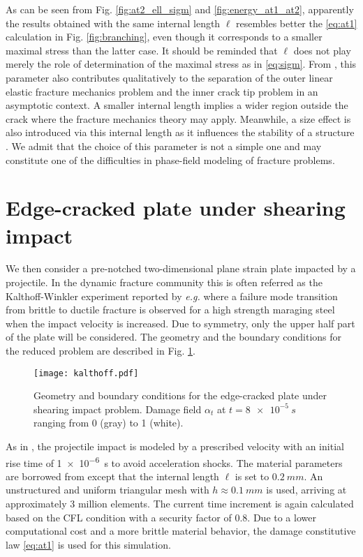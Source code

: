 As can be seen from Fig. \ref{fig:at2_ell_sigm} and \ref{fig:energy_at1_at2}, apparently the results obtained with the same internal length $\ell$ resembles better the \eqref{eq:at1} calculation in Fig. \ref{fig:branching}, even though it corresponds to a smaller maximal stress than the latter case. It should be reminded that $\ell$ does not play merely the role of determination of the maximal stress as in \eqref{eq:sigm}. From \cite{SicsicMarigo:2013}, this parameter also contributes qualitatively to the separation of the outer linear elastic fracture mechanics problem and the inner crack tip problem in an asymptotic context. A smaller internal length implies a wider region outside the crack where the fracture mechanics theory may apply. Meanwhile, a size effect is also introduced via this internal length as it influences the stability of a structure \cite{PhamMarigo:2013-1}. We admit that the choice of this parameter is not a simple one and may constitute one of the difficulties in phase-field modeling of fracture problems.

\section{Edge-cracked plate under shearing impact} \label{sec:kalthoff}
We then consider a pre-notched two-dimensional plane strain plate impacted by a projectile. In the dynamic fracture community this is often referred as the Kalthoff-Winkler experiment reported by \emph{e.g.} \cite{Kalthoff:2000} where a failure mode transition from brittle to ductile fracture is observed for a high strength maraging steel when the impact velocity is increased. Due to symmetry, only the upper half part of the plate will be considered. The geometry and the boundary conditions for the reduced problem are described in Fig. \ref{fig:kalthoff}.
\begin{figure}[htbp]
\centering
\texttt{[image: kalthoff.pdf]}
\caption{Geometry and boundary conditions for the edge-cracked plate under shearing impact problem. Damage field $\alpha_t$ at $t=\SI{8e-5}{s}$ ranging from 0 (gray) to 1 (white).} \label{fig:kalthoff}
\end{figure}
As in \cite{BordenVerhooselScottHughesLandis:2012,HofackerMiehe:2012}, the projectile impact is modeled by a prescribed velocity with an initial rise time of \SI{1e-6}{s} to avoid acceleration shocks. The material parameters are borrowed from \cite{BordenVerhooselScottHughesLandis:2012} except that the internal length $\ell$ is set to $\SI{0.2}{mm}$. An unstructured and uniform triangular mesh with $h\approx \SI{0.1}{mm}$ is used, arriving at approximately 3 million elements. The current time increment is again calculated based on the CFL condition with a security factor of 0.8. Due to a lower computational cost and a more brittle material behavior, the damage constitutive law \eqref{eq:at1} is used for this simulation.

